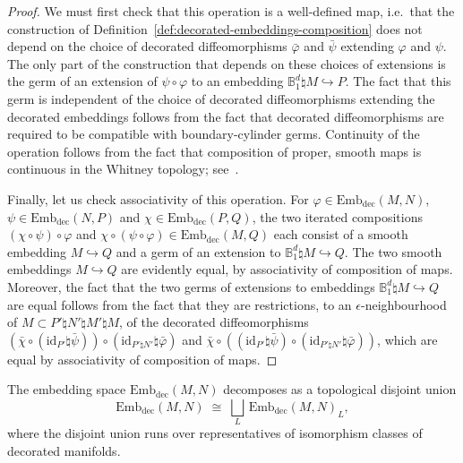 \documentclass[AHL,Unicode,published]{cedram}
\newcommand{\id}{\mathrm{id}}
\newcommand{\rdec}{\mathrm{dec}}
\newcommand{\bB}{\mathbb{B}}
\newcommand{\embdec}{\ensuremath{\mathrm{Emb}_{\rdec}}}
\begin{document}
\begin{proof}
We must first check that this operation is a well-defined map, i.e.~that the construction of Definition~\ref{def:decorated-embeddings-composition} does not depend on the choice of decorated diffeomorphisms $\bar{\varphi}$ and $\bar{\psi}$ extending $\varphi$ and $\psi$. The only part of the construction that depends on these choices of extensions is the germ of an extension of $\psi \circ \varphi$ to an embedding $\bB_{1}^d \natural M \hookrightarrow P$. The fact that this germ is independent of the choice of decorated diffeomorphisms extending the decorated embeddings follows from the fact that decorated diffeomorphisms are required to be compatible with boundary-cylinder germs. Continuity of the operation follows from the fact that composition of proper, smooth maps is continuous in the Whitney topology; see~\cite[\S~2, Prop.~1]{Mather1969}.

Finally, let us check associativity of this operation. For $\varphi\in\embdec(M,N)$, $\psi\in\embdec(N,P)$ and $\chi\in\embdec(P,Q)$, the two iterated compositions $(\chi \circ \psi) \circ \varphi$ and $\chi \circ (\psi \circ \varphi) \in \embdec(M,Q)$ each consist of a smooth embedding $M \hookrightarrow Q$ and a germ of an extension to $\bB_{1}^d \natural M \hookrightarrow Q$. The two smooth embeddings $M \hookrightarrow Q$ are evidently equal, by associativity of composition of maps. Moreover, the fact that the two germs of extensions to embeddings $\bB_{1}^d \natural M \hookrightarrow Q$ are equal follows from the fact that they are restrictions, to an $\epsilon$-neighbourhood of $M \subset P' \natural N' \natural M' \natural M$, of the decorated diffeomorphisms $(\bar{\chi} \circ (\id_{P'} \natural \bar{\psi})) \circ (\id_{P' \natural N'} \natural \bar{\varphi})$ and $\bar{\chi} \circ ((\id_{P'} \natural \bar{\psi}) \circ (\id_{P' \natural N'} \natural \bar{\varphi}))$, which are equal by associativity of composition of maps.
\end{proof}

\begin{lemm}\label{lem:decomposition-disjoint-union}
The embedding space $\embdec(M,N)$ decomposes as a topological disjoint union
\begin{equation}\label{eq:embdec-decomposition}
\embdec(M,N) \;\cong\; \bigsqcup_L \, \embdec(M,N)_L,
\end{equation}
where the disjoint union runs over representatives of isomorphism classes of decorated manifolds.
\end{lemm}
\end{document}
